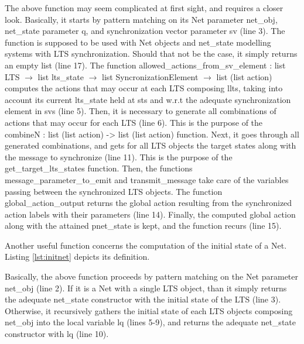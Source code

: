 	
	\noindent The above function may seem complicated at first sight, and requires 
	a closer look. Basically, it starts by pattern matching on its \textsf{Net} parameter
	\textsf{net\_obj}, \textsf{net\_state} parameter \textsf{q}, and synchronization vector parameter
	\textsf{sv} (line 3). The function is supposed to be used with \textsf{Net} objects and \textsf{net\_state}
	modelling systems with \textsf{LTS} synchronization. Should that not be the case, it simply returns
	an empty list (line 17). The function 
	\textsf{allowed\_actions\_from\_sv\_element : list LTS $\rightarrow$ list lts_state $\rightarrow$ 
	list SyncronizationElement $\rightarrow$ list (list action)} computes the \textsf{actions} that
	may occur at each \textsf{LTS} composing \textsf{llts}, taking into account its current
	\textsf{lts\_state} held at \textsf{sts} and w.r.t the adequate synchronization element
	in \textsf{svs} (line 5). Then, it is necessary to generate all combinations of \textsf{actions}
	that may occur for each \textsf{LTS} (line 6). This is the purpose of the
	\textsf{combineN : list (list action) -> list (list action)} function.  Next, it goes through 
	all generated combinations, and gets for all \textsf{LTS} objects
	the target states along with the message to synchronize (line 11). 
	This is the purpose of the \textsf{get\_target\_lts\_states}
	function. Then,  the functions \textsf{message\_parameter\_to\_emit} and
	\textsf{transmit\_message} take care of the variables passing between
	the synchronized \textsf{LTS} objects. The function 
	\textsf{global\_action\_output} returns the global action
	resulting from the synchronized \textsf{action} labels with their parameters (line 14).
	Finally, the computed global action along with the attained \textsf{pnet\_state} is kept,	
	and the function recurs (line 15). 
	 
		
		Another useful function concerns the computation of the initial state of a \textsf{Net}.
	Listing \ref{lst:initnet} depicts its definition.
	
			
	
	\noindent Basically, the above function proceeds by pattern matching on the \textsf{Net} parameter \textsf{net\_obj} (line 2). 
	If it is a \textsf{Net} with a single \textsf{LTS} object, than it simply returns the adequate \textsf{net\_state}
	constructor with the initial state of the \textsf{LTS} (line 3). Otherwise, it recursively
	gathers the initial state of each \textsf{LTS} objects composing \textsf{net\_obj} into
	the local variable \textsf{lq} (lines 5-9), and returns the adequate \textsf{net\_state}
	constructor with \textsf{lq} (line 10).
	

